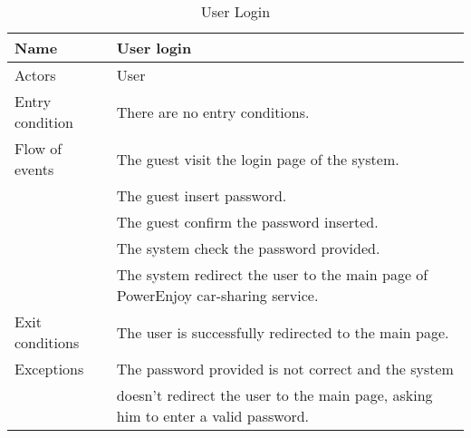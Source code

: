 \documentclass[10pt, a4paper,titlepage]{article}
\begin{document}
\begin{table}[h]
\caption{User Login} \label{tab:scenario2}
\begin{tabular}{|l|l|}
\hline
Name & User login \\
\hline
Actors & User \\
\hline
Entry condition & There are no entry conditions. \\
\hline
Flow of events & The guest visit the login page of the system. \\
& The guest insert password.\\
& The guest confirm the password inserted.\\
& The system check the password provided.\\
& The system redirect the user to the main page of PowerEnjoy car-sharing service.\\
\hline
Exit conditions & The user is successfully redirected to the main page. \\
\hline
Exceptions & The password provided is not correct and the system \\
& doesn't redirect the user to the main page, asking him to enter a valid password.\\
\hline
\end{tabular}
\end{table}
\end{document}

